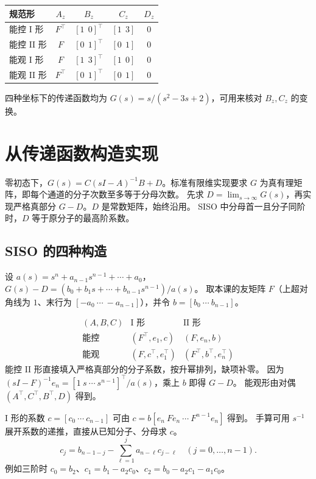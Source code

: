 \documentclass[UTF8,a4paper,12pt,fontset=fandol]{ctexart}
\begin{document}
\begin{center}
\renewcommand{\arraystretch}{1.2}
\begin{tabular}{@{}lcccc@{}}
\toprule
规范形 & $A_z$ & $B_z$ & $C_z$ & $D_z$ \\
\midrule
能控 I 形 & $F^\top$ & $[1\ \ 0]^\top$ & $[1\ \ 3]$ & $0$ \\
能控 II 形 & $F$ & $[0\ \ 1]^\top$ & $[0\ \ 1]$ & $0$ \\
能观 I 形 & $F$ & $[1\ \ 3]^\top$ & $[1\ \ 0]$ & $0$ \\
能观 II 形 & $F^\top$ & $[0\ \ 1]^\top$ & $[0\ \ 1]$ & $0$ \\
\bottomrule
\end{tabular}
\end{center}

四种坐标下的传递函数均为 $G(s)=s/(s^2-3s+2)$，可用来核对 $B_z,C_z$ 的变换。
\newpage
\section{从传递函数构造实现}\label{sec:realization}

零初态下，$G(s)=C(sI-A)^{-1}B+D$。标准有限维实现要求 $G$ 为真有理矩阵，即每个通道的分子次数至多等于分母次数。
先求 $D=\lim_{s\to\infty}G(s)$，再实现严格真部分 $G-D$。$D$ 是常数矩阵，始终沿用。
SISO 中分母首一且分子同阶时，$D$ 等于原分子的最高阶系数。

\subsection*{SISO 的四种构造}
设 $a(s)=s^n+a_{n-1}s^{n-1}+\cdots+a_0$，$G(s)-D=(b_0+b_1s+\cdots+b_{n-1}s^{n-1})/a(s)$。
取本课的友矩阵 $F$（上超对角线为 $1$、末行为 $[-a_0\ \cdots\ -a_{n-1}]$），并令 $b=[b_0\ \cdots\ b_{n-1}]$。
\begin{keybox}
\[
\begin{array}{c|cc}
  (A,B,C)&\text{I 形}&\text{II 形}\\ \hline
  \text{能控}&(F^\top,e_1,c)&(F,e_n,b)\\
  \text{能观}&(F,c^\top,e_1^\top)&(F^\top,b^\top,e_n^\top)
\end{array}
\]
能控 II 形直接填入严格真部分的分子系数，按升幂排列，缺项补零。
因为 $(sI-F)^{-1}e_n=[1\ s\ \cdots\ s^{n-1}]^\top/a(s)$，乘上 $b$ 即得 $G-D$。
能观形由对偶 $ (A^\top,C^\top,B^\top,D)$ 得到。
\end{keybox}

I 形的系数 $c=[c_0\ \cdots\ c_{n-1}]$ 可由 $c=b[e_n\ Fe_n\ \cdots\ F^{n-1}e_n]$ 得到。
手算可用 $s^{-1}$ 展开系数的递推，直接从已知分子、分母求 $c$。
\[
 c_j=b_{n-1-j}-\sum_{\ell=1}^{j}a_{n-\ell}c_{j-\ell}
 \quad (j=0,\ldots,n-1).
\]
例如三阶时 $c_0=b_2$、$c_1=b_1-a_2c_0$、$c_2=b_0-a_2c_1-a_1c_0$。
\end{document}
